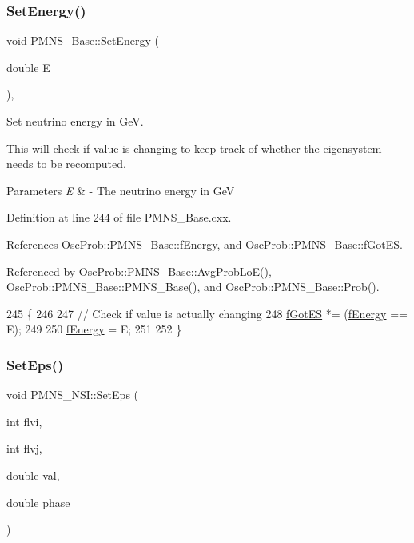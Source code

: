 \subsubsection{\texorpdfstring{Set\+Energy()}{SetEnergy()}}
{\footnotesize\ttfamily void P\+M\+N\+S\+\_\+\+Base\+::\+Set\+Energy (\begin{DoxyParamCaption}\item[{double}]{E }\end{DoxyParamCaption})\hspace{0.3cm}{\ttfamily [virtual]}, {\ttfamily [inherited]}}

Set neutrino energy in GeV.

This will check if value is changing to keep track of whether the eigensystem needs to be recomputed.


\begin{DoxyParams}{Parameters}
{\em E} & -\/ The neutrino energy in GeV \\
\hline
\end{DoxyParams}


Definition at line 244 of file P\+M\+N\+S\+\_\+\+Base.\+cxx.



References Osc\+Prob\+::\+P\+M\+N\+S\+\_\+\+Base\+::f\+Energy, and Osc\+Prob\+::\+P\+M\+N\+S\+\_\+\+Base\+::f\+Got\+ES.



Referenced by Osc\+Prob\+::\+P\+M\+N\+S\+\_\+\+Base\+::\+Avg\+Prob\+Lo\+E(), Osc\+Prob\+::\+P\+M\+N\+S\+\_\+\+Base\+::\+P\+M\+N\+S\+\_\+\+Base(), and Osc\+Prob\+::\+P\+M\+N\+S\+\_\+\+Base\+::\+Prob().


\begin{DoxyCode}
245 \{
246 
247   \textcolor{comment}{// Check if value is actually changing}
248   \hyperlink{classOscProb_1_1PMNS__Base_a6dc5cd010d2d70b2324745b4e53e9839}{fGotES} *= (\hyperlink{classOscProb_1_1PMNS__Base_a2800af6d436972f3e900867790c046b0}{fEnergy} == E);
249 
250   \hyperlink{classOscProb_1_1PMNS__Base_a2800af6d436972f3e900867790c046b0}{fEnergy} = E;
251 
252 \}
\end{DoxyCode}
\mbox{\label{classOscProb_1_1PMNS__NSI_a87c508149ea36b6de493a6817247a0ea}} 
\subsubsection{\texorpdfstring{Set\+Eps()}{SetEps()}}
{\footnotesize\ttfamily void P\+M\+N\+S\+\_\+\+N\+S\+I\+::\+Set\+Eps (\begin{DoxyParamCaption}\item[{int}]{flvi,  }\item[{int}]{flvj,  }\item[{double}]{val,  }\item[{double}]{phase }\end{DoxyParamCaption})\hspace{0.3cm}{\ttfamily [virtual]}}


